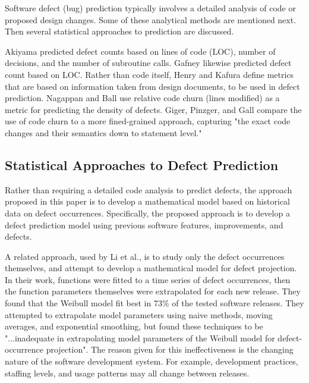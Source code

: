 \documentclass[a4paper]{scrartcl}
\begin{document}
Software defect (bug) prediction typically involves a detailed analysis of code or proposed design changes. Some of these analytical methods are mentioned next. Then several statistical approaches to prediction are discussed.

Akiyama \cite{1971_akiyama} predicted defect counts based on lines of code (LOC), number of decisions, and the number of subroutine calls. Gafney \cite{1984_gaffney_estimating} likewise predicted defect count based on LOC. Rather than code itself, Henry and Kafura \cite{1984_henry_evaluation} define metrics that are based on information taken from design documents, to be used in defect prediction. Nagappan and Ball \cite{2005_nagappan_codechurn} use relative code churn (lines modified) as a metric for predicting the density of defects. Giger, Pinzger, and Gall \cite{2011_giger_finegrained} compare the use of code churn to a more fined-grained approach, capturing "the exact code changes and their semantics down to statement level."

\subsection*{Statistical Approaches to Defect Prediction}
Rather than requiring a detailed code analysis to predict defects, the approach proposed in this paper is to develop a mathematical model based on historical data on defect occurrences. Specifically, the proposed approach is to develop a defect prediction model using previous software features, improvements, and defects.

A related approach, used by Li et al.\cite{2004_li_emperical_eval}, is to study only the defect occurrences themselves, and attempt to develop a mathematical model for defect projection. In their work, functions were fitted to a time series of defect occurrences, then the function parameters themselves were extrapolated for each new release. They found that the Weibull model fit best in 73\% of the tested software releases. They attempted to extrapolate model parameters using naive methods, moving averages, and exponential smoothing, but found these techniques to be "...inadequate in extrapolating model parameters of the Weibull model for defect-occurrence projection". The reason given for this ineffectiveness is the changing nature of the software development system. For example, development practices, staffing levels, and usage patterns may all change between releases.
\end{document}
